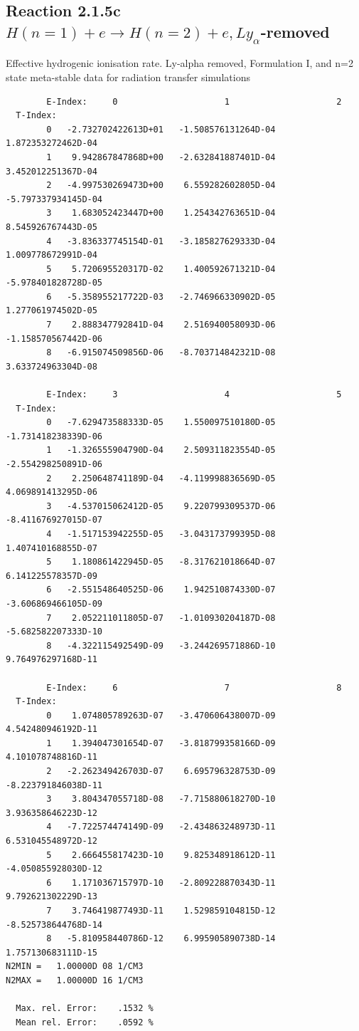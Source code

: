 \documentclass[12pt,dvipdfmx]{article}
\begin{document}
\subsection{
Reaction 2.1.5c  $H(n=1) + e \rightarrow H(n=2) + e, Ly_\alpha$-removed}


   Effective hydrogenic ionisation rate.
   Ly-alpha removed, Formulation I, and n=2 state meta-stable
   data for radiation transfer simulations

\begin{small}\begin{verbatim}
        E-Index:     0                     1                     2
  T-Index:
        0   -2.732702422613D+01   -1.508576131264D-04    1.872353272462D-04
        1    9.942867847868D+00   -2.632841887401D-04    3.452012251367D-04
        2   -4.997530269473D+00    6.559282602805D-04   -5.797337934145D-04
        3    1.683052423447D+00    1.254342763651D-04    8.545926767443D-05
        4   -3.836337745154D-01   -3.185827629333D-04    1.009778672991D-04
        5    5.720695520317D-02    1.400592671321D-04   -5.978401828728D-05
        6   -5.358955217722D-03   -2.746966330902D-05    1.277061974502D-05
        7    2.888347792841D-04    2.516940058093D-06   -1.158570567442D-06
        8   -6.915074509856D-06   -8.703714842321D-08    3.633724963304D-08

        E-Index:     3                     4                     5
  T-Index:
        0   -7.629473588333D-05    1.550097510180D-05   -1.731418238339D-06
        1   -1.326555904790D-04    2.509311823554D-05   -2.554298250891D-06
        2    2.250648741189D-04   -4.119998836569D-05    4.069891413295D-06
        3   -4.537015062412D-05    9.220799309537D-06   -8.411676927015D-07
        4   -1.517153942255D-05   -3.043173799395D-08    1.407410168855D-07
        5    1.180861422945D-05   -8.317621018664D-07    6.141225578357D-09
        6   -2.551548640525D-06    1.942510874330D-07   -3.606869466105D-09
        7    2.052211011805D-07   -1.010930204187D-08   -5.682582207333D-10
        8   -4.322115492549D-09   -3.244269571886D-10    9.764976297168D-11

        E-Index:     6                     7                     8
  T-Index:
        0    1.074805789263D-07   -3.470606438007D-09    4.542480946192D-11
        1    1.394047301654D-07   -3.818799358166D-09    4.101078748816D-11
        2   -2.262349426703D-07    6.695796328753D-09   -8.223791846038D-11
        3    3.804347055718D-08   -7.715880618270D-10    3.936358646223D-12
        4   -7.722574474149D-09   -2.434863248973D-11    6.531045548972D-12
        5    2.666455817423D-10    9.825348918612D-11   -4.050855928030D-12
        6    1.171036715797D-10   -2.809228870343D-11    9.792621302229D-13
        7    3.746419877493D-11    1.529859104815D-12   -8.525738644768D-14
        8   -5.810958440786D-12    6.995905890738D-14    1.757130683111D-15
N2MIN =   1.00000D 08 1/CM3
N2MAX =   1.00000D 16 1/CM3

  Max. rel. Error:    .1532 %
  Mean rel. Error:    .0592 %


\end{verbatim}\end{small}
\end{document}
